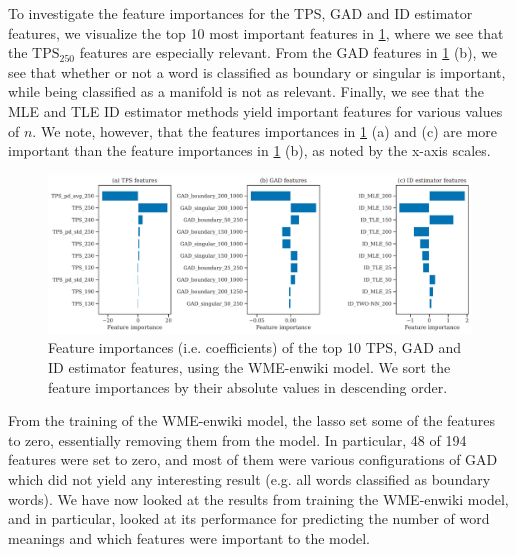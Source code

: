 To investigate the feature importances for the TPS, GAD and ID estimator features, we visualize the top 10 most important features in \cref{fig:wme-enwiki-feature-importances-tps-gad-estimated-ids}, where we see that the $\text{TPS}_{250}$ features are especially relevant. From the GAD features in \cref{fig:wme-enwiki-feature-importances-tps-gad-estimated-ids} (b), we see that whether or not a word is classified as boundary or singular is important, while being classified as a manifold is not as relevant. Finally, we see that the MLE and TLE ID estimator methods yield important features for various values of $n$. We note, however, that the features importances in \cref{fig:wme-enwiki-feature-importances-tps-gad-estimated-ids} (a) and (c) are more important than the feature importances in \cref{fig:wme-enwiki-feature-importances-tps-gad-estimated-ids} (b), as noted by the x-axis scales.
\begin{figure}[H]
    \centering
    \includegraphics[width=\textwidth]{thesis/figures/wme-enwiki-top-10-feature-importances-tps-gad-estimated-ids.pdf}
    \caption{Feature importances (i.e. coefficients) of the top 10 TPS, GAD and ID estimator features, using the WME-enwiki model. We sort the feature importances by their absolute values in descending order.}
    \label{fig:wme-enwiki-feature-importances-tps-gad-estimated-ids}
\end{figure}

From the training of the WME-enwiki model, the lasso set some of the features to zero, essentially removing them from the model. In particular, 48 of 194 features were set to zero, and most of them were various configurations of GAD which did not yield any interesting result (e.g. all words classified as boundary words). We have now looked at the results from training the WME-enwiki model, and in particular, looked at its performance for predicting the number of word meanings and which features were important to the model.

